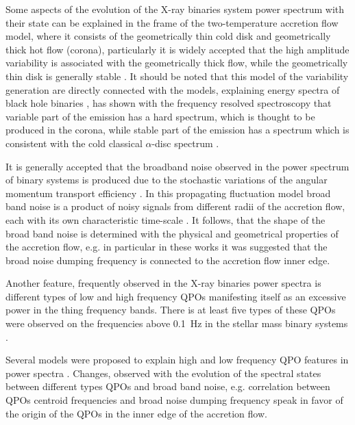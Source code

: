 \documentclass[a4paper,fleqn,usenatbib]{mnras}
\begin{document}
    Some aspects of the evolution of the X-ray binaries system power spectrum with their state can be explained in the frame of the two-temperature accretion flow model, where it consists of the geometrically thin cold disk and geometrically thick hot flow (corona), particularly it is widely accepted that the high amplitude variability is associated with the geometrically thick flow, while the geometrically thin disk is generally stable \citep{2001MNRAS.321..759C}. 
It should be noted that this model of the variability generation are directly connected with the models, explaining energy spectra of black hole binaries \citep[see, e.g.,][]{1975ApJ...199L.153E, 1976ApJ...204..187S, 1995ApJ...452..710N}, \citet{2001MNRAS.321..759C} has shown with the frequency resolved spectroscopy that variable part of the emission has a hard spectrum, which is thought to be produced in the corona, while stable part of the emission has a spectrum which is consistent with the cold classical $\alpha$-disc spectrum \citep{ss73}.

    It is generally accepted that the broadband noise observed in the power spectrum of binary systems is produced due to the stochastic variations of the angular momentum transport efficiency \citep{1997MNRAS.292..679L}. 
    In this propagating fluctuation model broad band noise is a product of noisy signals from different radii of the accretion flow, each with its own characteristic time-scale \citep[see, e.g.][]{2006MNRAS.367..801A, 2013MNRAS.434.1476I}.
    It follows, that the shape of the broad band noise is determined with the physical and geometrical properties of the accretion flow, e.g. in particular in these works it was suggested that the broad noise dumping frequency is connected to the accretion flow inner edge.

    Another feature, frequently observed in the X-ray binaries power spectra is different types of low and high frequency QPOs manifesting itself as an excessive power in the thing frequency bands. 
    There is at least five types of these QPOs were observed on the frequencies above 0.1~Hz in the stellar mass binary systems \citep[for classification see][]{2005Ap&SS.300..107H}.

Several models were proposed to explain high and low frequency QPO features in power spectra \citep[][]{1997ApJ...489..865E, 1998ApJ...506..281B, 1998ApJ...492L..59S, 1999A&A...349.1003T, 1999ApJ...518L..95T, 2001A&A...374L..19A, 2009MNRAS.397L.101I, 2011MNRAS.415.2323I}. 
Changes, observed with the evolution of the spectral states between different types QPOs and broad band noise, e.g. correlation between QPOs centroid frequencies and broad noise dumping frequency \citep{1999ApJ...514..939W, 2014MNRAS.437.2554M} speak in favor of the origin of the QPOs in the inner edge of the accretion flow.
\end{document}
